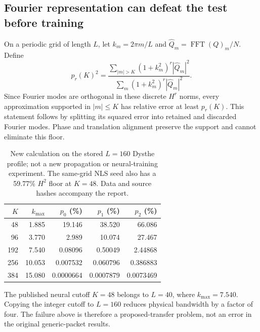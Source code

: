 \documentclass[11pt]{article}
\begin{document}
\subsection{Fourier representation can defeat the test before training}
On a periodic grid of length $L$, let $k_m=2\pi m/L$ and
$\widehat Q_m=\operatorname{FFT}(Q)_m/N$. Define
\begin{equation}\label{eq:floor}
p_r(K)^2=\frac{\sum_{|m|>K}(1+k_m^2)^r|\widehat Q_m|^2}
                 {\sum_m(1+k_m^2)^r|\widehat Q_m|^2}.
\end{equation}
Since Fourier modes are orthogonal in these discrete $H^r$ norms, every
approximation supported in $|m|\leq K$ has relative error at least $p_r(K)$.
This statement follows by splitting its squared error into retained and
discarded Fourier modes. Phase and translation alignment preserve the support
and cannot eliminate this floor.

\begin{table}[h]\centering\small
\begin{tabular}{rrrrr}\toprule
$K$ & $k_{\max}$ & $p_0$ (\%) & $p_1$ (\%) & $p_2$ (\%)\\\midrule
48 & 1.885 & 19.146 & 38.520 & 66.086\\
96 & 3.770 & 2.989 & 10.074 & 27.467\\
192 & 7.540 & 0.08096 & 0.50049 & 2.44868\\
256 & 10.053 & 0.007532 & 0.060796 & 0.386883\\
384 & 15.080 & 0.0000664 & 0.0007879 & 0.0073469\\\bottomrule
\end{tabular}
\caption{New calculation on the stored $L=160$ Dysthe profile; not a new
propagation or neural-training experiment. The same-grid NLS seed also has a
59.77\% $H^2$ floor at $K=48$. Data and source hashes accompany the report.}
\end{table}

The published neural cutoff $K=48$ belongs to $L=40$, where $k_{\max}=7.540$.
Copying the integer cutoff to $L=160$ reduces physical bandwidth by a factor of
four. The failure above is therefore a proposed-transfer problem, not an error
in the original generic-packet results.
\end{document}
